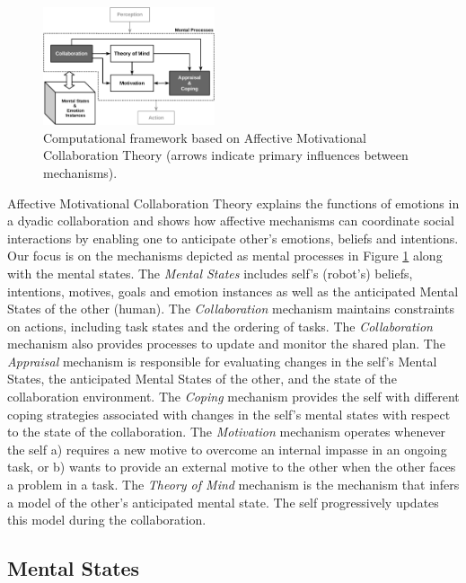 \documentclass[letterpaper]{article}
\begin{document}
\begin{figure}[tbh]
  \centering
  \includegraphics[width=0.45\textwidth]{figure/theory-general-croped.pdf}
  \caption{{\fontsize{9}{9}\selectfont Computational framework based on
  Affective Motivational Collaboration Theory (arrows indicate primary
  influences between mechanisms).}}
  \label{fig:cpm}
\end{figure}

Affective Motivational Collaboration Theory explains the functions of emotions
in a dyadic collaboration and shows how affective mechanisms can coordinate
social interactions by enabling one to anticipate other's emotions, beliefs and
intentions. Our focus is on the mechanisms depicted as mental processes in
Figure \ref{fig:cpm} along with the mental states. The \textit{Mental States}
includes self's (robot's) beliefs, intentions, motives, goals and emotion
instances as well as the anticipated Mental States of the other (human). The
\textit{Collaboration} mechanism maintains constraints on actions, including
task states and the ordering of tasks. The \textit{Collaboration} mechanism also
provides processes to update and monitor the shared plan. The \textit{Appraisal}
mechanism is responsible for evaluating changes in the self's Mental States, the
anticipated Mental States of the other, and the state of the collaboration
environment. The \textit{Coping} mechanism provides the self with different
coping strategies associated with changes in the self's mental states with
respect to the state of the collaboration. The \textit{Motivation} mechanism
operates whenever the self a) requires a new motive to overcome an internal
impasse in an ongoing task, or b) wants to provide an external motive to the
other when the other faces a problem in a task. The \textit{Theory of Mind}
mechanism is the mechanism that infers a model of the other's anticipated mental
state. The self progressively updates this model during the collaboration.

\subsection{Mental States}
\label{sec:mental-states}
\end{document}
